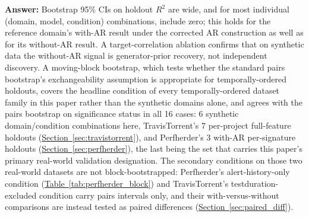 \documentclass[technologies,article,submit,pdftex,moreauthors]{Definitions/mdpi}
\begin{document}
\textbf{Answer:} Bootstrap 95\% CIs on holdout \(R^2\) are wide, and for most individual (domain, model, condition) combinations, include zero; this holds for the reference domain's with-AR result under the corrected AR construction as well as for its without-AR result. A target-correlation ablation confirms that on synthetic data the without-AR signal is generator-prior recovery, not independent discovery. A moving-block bootstrap, which tests whether the standard pairs bootstrap's exchangeability assumption is appropriate for temporally-ordered holdouts, covers the headline condition of every temporally-ordered dataset family in this paper rather than the synthetic domains alone, and agrees with the pairs bootstrap on significance status in all 16 cases: 6 synthetic domain/condition combinations here, TravisTorrent's 7 per-project full-feature holdouts (\hyperref[sec:travistorrent]{Section~\ref*{sec:travistorrent}}), and Perfherder's 3 with-AR per-signature holdouts (\hyperref[sec:perfherder]{Section~\ref*{sec:perfherder}}), the last being the set that carries this paper's primary real-world validation designation. The secondary conditions on those two real-world datasets are not block-bootstrapped: Perfherder's alert-history-only condition (\hyperref[tab:perfherder_block]{Table~\ref*{tab:perfherder_block}}) and TravisTorrent's testduration-excluded condition carry pairs intervals only, and their with-versus-without comparisons are instead tested as paired differences (\hyperref[sec:paired_diff]{Section~\ref*{sec:paired_diff}}).
\end{document}
